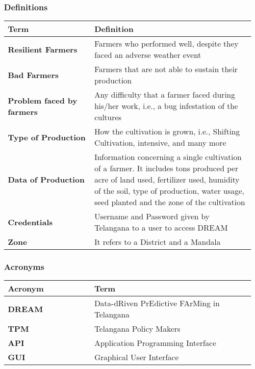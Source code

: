 \subsubsection{Definitions}
\begin{center}
    \begin{tabular}{@{}p{0.35\linewidth} p{0.65\linewidth}}
        \hline
        \textbf{Term} & \textbf{Definition}\\
        \hline
        \textbf{Resilient Farmers} & Farmers who performed well, despite they faced an adverse weather event\\
        \textbf{Bad Farmers} & Farmers that are not able to sustain their production\\
        \textbf{Problem faced by farmers} & Any difficulty that a farmer faced during his/her work, i.e., a bug infestation of the cultures\\
        \textbf{Type of Production} & How the cultivation is grown, i.e., Shifting Cultivation, intensive, and many more\\
        \textbf{Data of Production} & Information concerning a single cultivation of a farmer. It includes tons produced per acre of land used, fertilizer used, humidity of the soil, type of production, water usage, seed planted and the zone of the cultivation\\
        \textbf{Credentials} & Username and Password given by Telangana to a user to access DREAM\\
        \textbf{Zone} & It refers to a District and a Mandala\\
        \hline
    \end{tabular}
\end{center}

\subsubsection{Acronyms}
\begin{center}
    \begin{tabular}{p{0.35\linewidth} p{0.65\linewidth}}
    \hline
        \textbf{Acronym} & \textbf{Term}\\
        \hline
        \textbf{DREAM} & Data-dRiven PrEdictive FArMing in Telangana\\
        \textbf{TPM} & Telangana Policy Makers\\
        \textbf{API} & Application Programming Interface\\
        \textbf{GUI} & Graphical User Interface\\
    \hline
    \end{tabular}
\end{center}


